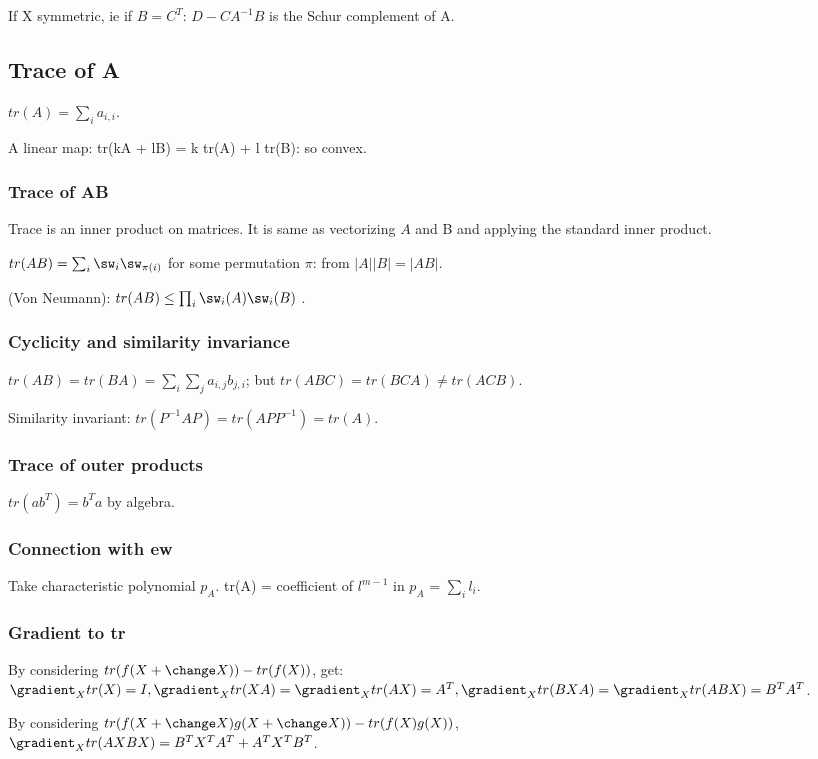\documentclass[oneside, article]{memoir}
\begin{document}
If X symmetric, ie if $B = C^{T}$: $D-CA^{-1}B$ is the Schur complement of A.

\subsection{Trace of A}
$tr(A) = \sum_{i} a_{i,i}$.

A linear map: tr(kA + lB) = k tr(A) + l tr(B): so convex.

\subsubsection{Trace of AB}
Trace is an inner product on matrices. It is same as vectorizing $A$ and B and applying the standard inner product.

$tr(AB) =  \sum_{i} \sw_{i} \sw_{\pi(i)}$ for some permutation $\pi$: from $|A||B|=|AB|$.

(Von Neumann): $tr(AB) \leq \prod_{i} \sw_{i}(A)\sw_{i}(B)$ \why.

\subsubsection{Cyclicity and similarity invariance}
$tr(AB) = tr(BA) = \sum_{i} \sum_{j} a_{i,j}b_{j,i}$; but $tr(ABC) = tr(BCA) \neq tr(ACB)$.

Similarity invariant: $tr(P^{-1}AP) = tr(APP^{-1}) = tr(A)$.

\subsubsection{Trace of outer products}
$tr(ab^{T}) = b^{T}a$ by algebra.

\subsubsection{Connection with ew}
Take characteristic polynomial $p_A$. tr(A) = coefficient of $l^{m-1}$ in $p_{A}$ = $\sum_{i} l_{i}$.

\subsubsection{Gradient to tr}
By considering $tr(f(X + \change X)) - tr(f(X))$, get: $\gradient_X tr(X) = I, \gradient_X tr(XA) = \gradient_X tr(AX) = A^{T}, \gradient_X tr(BXA) = \gradient_X tr(ABX) = B^{T}A^{T}$.

By considering $tr(f(X + \change X)g(X + \change X))- tr(f(X)g(X))$, \\
$\gradient_X tr(AXBX) = B^{T}X^{T}A^{T} + A^{T}X^{T}B^{T}$.
\end{document}
